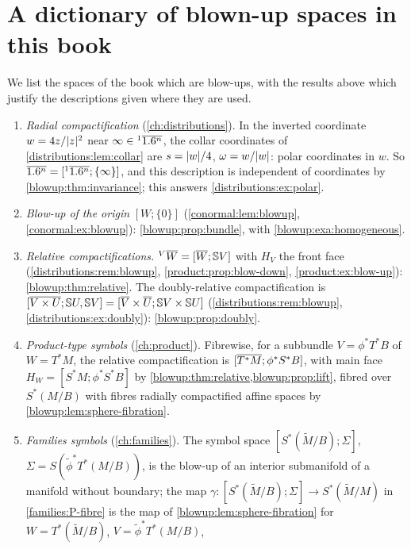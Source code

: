 \section{A dictionary of blown-up spaces in this book}\label{blowup:sec:dictionary}

We list the spaces of the book which are blow-ups, with the results above which justify
the descriptions given where they are used.

\begin{enumerate}[label=(\arabic*),leftmargin=*]
\item \emph{Radial compactification} (\cref{ch:distributions}). In the inverted coordinate
$w=4z/\lvert z\rvert^2$ near $\infty\in{}^{1}\overline{1.6^n}$, the collar coordinates of
\cref{distributions:lem:collar} are $s=\lvert w\rvert/4$, $\omega=w/\lvert w\rvert$: polar coordinates in
$w$. So $\overline{1.6^n}=[{}^{1}\overline{1.6^n};\{\infty\}]$, and this description is independent of
coordinates by \cref{blowup:thm:invariance}; this answers \cref{distributions:ex:polar}.
\item \emph{Blow-up of the origin} $[W;\{0\}]$ (\cref{conormal:lem:blowup},
\cref{conormal:ex:blowup}): \cref{blowup:prop:bundle}, with \cref{blowup:exa:homogeneous}.
\item \emph{Relative compactifications.} ${}^{V}\overline{W}=[\overline{W};\mathbb{S} V]$ with $H_V$ the front
face (\cref{distributions:rem:blowup}, \cref{product:prop:blow-down},
\cref{product:ex:blow-up}): \cref{blowup:thm:relative}. The doubly-relative
compactification is $[\overline{V\times U};\mathbb{S} U,\mathbb{S} V]=[\overline{V}\times\overline{U};\mathbb{S} V\times\mathbb{S} U]$
(\cref{distributions:rem:blowup}, \cref{distributions:ex:doubly}):
\cref{blowup:prop:doubly}.
\item \emph{Product-type symbols} (\cref{ch:product}). Fibrewise, for a subbundle
$V=\phi^*T^*B$ of $W=T^*M$, the relative compactification is
$[\overline{T^*M};\phi^*S^*B]$, with main face $H_W=[S^*M;\phi^*S^*B]$ by
\cref{blowup:thm:relative,blowup:prop:lift}, fibred over $S^*(M/B)$ with fibres radially
compactified affine spaces by \cref{blowup:lem:sphere-fibration}.
\item \emph{Families symbols} (\cref{ch:families}). The symbol space
$[S^*(\tilde M/B);\Sigma]$, $\Sigma=S(\tilde\phi^*T^*(M/B))$, is the blow-up of an interior
submanifold of a manifold without boundary; the map
$\gamma:[S^*(\tilde M/B);\Sigma]\to S^*(\tilde M/M)$ in \ref{families:P-fibre} is the map of
\cref{blowup:lem:sphere-fibration} for $W=T^*(\tilde M/B)$, $V=\tilde\phi^*T^*(M/B)$,

\end{enumerate}

